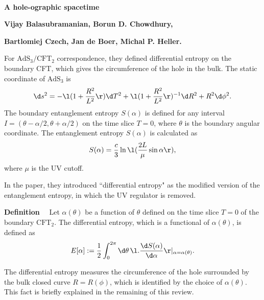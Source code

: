 \documentclass[12pt]{article}
\date{}
\renewcommand{\thefootnote}{\fnsymbol{footnote}}
\newcommand{\AdS}[0]{\textrm{AdS}}
\newcommand{\CFT}[0]{\textrm{CFT}}
\begin{document}
{\Large{}\\[2mm]
\textbf{A hole-ographic spacetime
\cite{Balasubramanian:2013lsa}}
}

\noindent
\hfill
\textbf{Vijay Balasubramanian, Borun D. Chowdhury,}

\hfill
\textbf{Bartlomiej Czech, Jan de Boer, Michal P. Heller.}

\renewcommand{\thefootnote}{\arabic{footnote})}
\setcounter{footnote}{0}
\vspace{12pt}

For $\AdS_3/ \CFT_2$ correspondence, they defined differential entropy on the boundary  CFT, which gives the circumference of the hole in the bulk.
The static coordinate of $\AdS_3$ is
\begin{align}
	\d s^2 = -\l(1+\frac{R^2}{L^2}\r)\d T^2 + \l(1 + \frac{R^2}{L^2}\r)^{-1}\d R^2 + R^2 \d \phi^2.
\end{align}
The boundary entanglement entropy $S(\alpha)$ is defined for any interval $I = (\theta - \alpha/2,\theta + \alpha/2)$ on the time slice $T=0$, where $\theta$ is the boundary angular coordinate. The entanglement entropy $S(\alpha)$ is calculated as
\begin{align}
	S(\alpha) = \frac{c}{3}\ln\l(\frac{2L}{\mu}\sin\alpha\r),
\end{align}
where $\mu$ is the UV cutoff.

In the paper, they introduced ``differential entropy" as the modified version of the entanglement entropy, in which the UV regulator is removed.

\noindent
\textbf{Definition}~~
Let $\alpha(\theta)$ be a function of $\theta$ defined on the time slice $T=0$ of the boundary $\CFT_2$.
The differential entropy, which is a functional of $\alpha(\theta)$, is defined as
\begin{align}
	E[\alpha] := \frac{1}{2}\int_0^{2\pi}\d\theta\,\l.\frac{\d S(\alpha)}{\d \alpha}\r|_{\alpha = \alpha(\theta)}.
\end{align}

\noindent
The differential entropy measures the circumference of the hole surrounded by the bulk closed curve $R = R(\phi)$, which is identified by the choice of $\alpha(\theta)$.
This fact is briefly explained in the remaining of this review.
\end{document}
